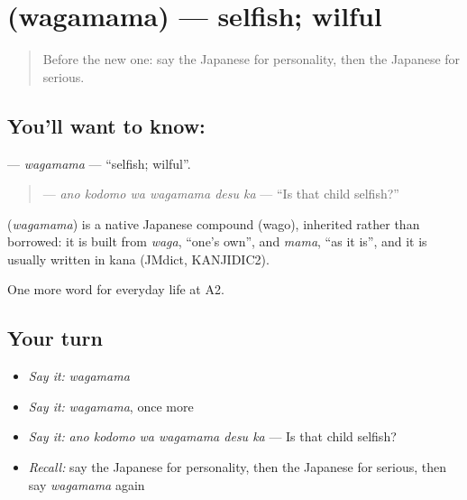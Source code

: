 \section[\texorpdfstring{\ja{わがまま} (wagamama)}{わがまま (wagamama)}]{ (wagamama) — selfish; wilful}

\label{lesson:JA-C249-wagamama}



\begin{quote}
Before the new one: say the Japanese for personality, then the Japanese for serious.
\end{quote}

\subsection*{You'll want to know: }
\textbf{} — \emph{wagamama} — \textquotedblleft{}selfish; wilful\textquotedblright{}.

\begin{quote}
\textbf{  } — \emph{ano kodomo wa wagamama desu ka} — \textquotedblleft{}Is that child selfish?\textquotedblright{}
\end{quote}

\begin{cousinweb}
\textbf{} (\emph{wagamama}) is a native Japanese compound (wago), inherited rather than borrowed: it is built from \emph{waga}, \textquotedblleft{}one's own\textquotedblright{}, and \emph{mama}, \textquotedblleft{}as it is\textquotedblright{}, and it is usually written in kana (JMdict, KANJIDIC2).
\end{cousinweb}

\begin{grammarlens}[title={What you've built}]
One more word for everyday life at A2.
\end{grammarlens}

\subsection*{Your turn}
\begin{itemize}
\raggedright
  \item \emph{Say it:} \emph{wagamama}
  \item \emph{Say it:} \emph{wagamama}, once more
  \item \emph{Say it:} \emph{ano kodomo wa wagamama desu ka} — Is that child selfish?
  \item \emph{Recall:} say the Japanese for personality, then the Japanese for serious, then say \emph{wagamama} again
\end{itemize}

